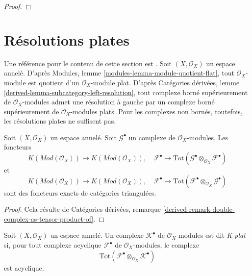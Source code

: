 {\begin{proof}
\end{proof}









\section{Résolutions plates}

\label{section-flat}

\noindent
Une référence pour le contenu de cette section est \cite{Spaltenstein}. Soit $(X, \mathcal{O}_X)$ un espace annelé. D'après Modules, lemme \ref{modules-lemma-module-quotient-flat}, tout $\mathcal{O}_X$-module est quotient d'un $\mathcal{O}_X$-module plat. D'après Catégories dérivées, lemme \ref{derived-lemma-subcategory-left-resolution}, tout complexe borné supérieurement de $\mathcal{O}_X$-modules admet une résolution à gauche par un complexe borné supérieurement de $\mathcal{O}_X$-modules plats. Pour les complexes non bornés, toutefois, les résolutions plates ne suffisent pas.

\begin{lemma}

\label{lemma-derived-tor-exact}
Soit $(X, \mathcal{O}_X)$ un espace annelé. Soit $\mathcal{G}^\bullet$ un complexe de $\mathcal{O}_X$-modules. Les foncteurs $$
K(\textit{Mod}(\mathcal{O}_X))
\longrightarrow
K(\textit{Mod}(\mathcal{O}_X)),
\quad
\mathcal{F}^\bullet \longmapsto
\text{Tot}(\mathcal{G}^\bullet \otimes_{\mathcal{O}_X} \mathcal{F}^\bullet)
$$ et $$
K(\textit{Mod}(\mathcal{O}_X))
\longrightarrow
K(\textit{Mod}(\mathcal{O}_X)),
\quad
\mathcal{F}^\bullet \longmapsto
\text{Tot}(\mathcal{F}^\bullet \otimes_{\mathcal{O}_X} \mathcal{G}^\bullet)
$$ sont des foncteurs exacts de catégories triangulées.
\end{lemma}

\begin{proof}
Cela résulte de Catégories dérivées, remarque \ref{derived-remark-double-complex-as-tensor-product-of}.
\end{proof}

\begin{definition}

\label{definition-K-flat}

Soit $(X, \mathcal{O}_X)$ un espace annelé. Un complexe $\mathcal{K}^\bullet$ de $\mathcal{O}_X$-modules est dit {\it K-plat} si, pour tout complexe acyclique $\mathcal{F}^\bullet$
de $\mathcal{O}_X$-modules, le complexe
$$
\text{Tot}(\mathcal{F}^\bullet \otimes_{\mathcal{O}_X} \mathcal{K}^\bullet)
$$
est acyclique.


\end{definition}}
